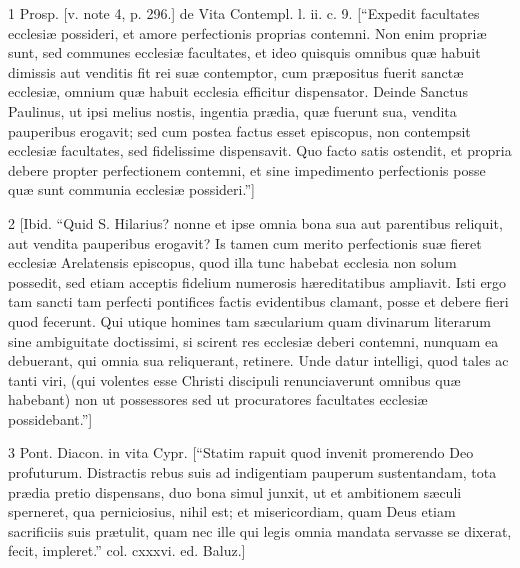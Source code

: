 1
Prosp. [v. note 4, p. 296.] de Vita Contempl. l. ii. c. 9. [“Expedit facultates ecclesiæ possideri, et amore perfectionis proprias contemni. Non enim propriæ sunt, sed communes ecclesiæ facultates, et ideo quisquis omnibus quæ habuit dimissis aut venditis fit rei suæ contemptor, cum præpositus fuerit sanctæ ecclesiæ, omnium quæ habuit ecclesia efficitur dispensator. Deinde Sanctus Paulinus, ut ipsi melius nostis, ingentia prædia, quæ fuerunt sua, vendita pauperibus erogavit; sed cum postea factus esset episcopus, non contempsit ecclesiæ facultates, sed fidelissime dispensavit. Quo facto satis ostendit, et propria debere propter perfectionem contemni, et sine impedimento perfectionis posse quæ sunt communia ecclesiæ possideri.”]

2
[Ibid. “Quid S. Hilarius? nonne et ipse omnia bona sua aut parentibus reliquit, aut vendita pauperibus erogavit? Is tamen cum merito perfectionis suæ fieret ecclesiæ Arelatensis episcopus, quod illa tunc habebat ecclesia non solum possedit, sed etiam acceptis fidelium numerosis hæreditatibus ampliavit. Isti ergo tam sancti tam perfecti pontifices factis evidentibus clamant, posse et debere fieri quod fecerunt. Qui utique homines tam sæcularium quam divinarum literarum sine ambiguitate doctissimi, si scirent res ecclesiæ deberi contemni, nunquam ea debuerant, qui omnia sua reliquerant, retinere. Unde datur intelligi, quod tales ac tanti viri, (qui volentes esse Christi discipuli renunciaverunt omnibus quæ habebant) non ut possessores sed ut procuratores facultates ecclesiæ possidebant.”]

3
Pont. Diacon. in vita Cypr. [“Statim rapuit quod invenit promerendo Deo profuturum. Distractis rebus suis ad indigentiam pauperum sustentandam, tota prædia pretio dispensans, duo bona simul junxit, ut et ambitionem sæculi sperneret, qua perniciosius, nihil est; et misericordiam, quam Deus etiam sacrificiis suis prætulit, quam nec ille qui legis omnia mandata servasse se dixerat, fecit, impleret.” col. cxxxvi. ed. Baluz.]


